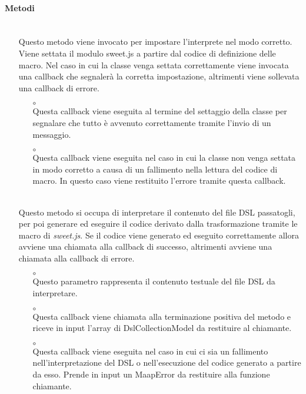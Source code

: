 \paragraph*{Metodi}
\begin{itemize}
\item[]  \\ Questo metodo viene invocato per impostare l'interprete nel modo corretto. Viene settata il modulo sweet.js a partire dal codice di definizione delle macro. Nel caso in cui la classe venga settata correttamente viene invocata una callback che segnalerà la corretta impostazione, altrimenti viene sollevata una callback di errore.
\begin{itemize}\addtolength{\itemsep}{-0.5\baselineskip}
\item[$\circ$]  \\ Questa callback viene eseguita al termine del settaggio della classe per segnalare che tutto è avvenuto correttamente tramite l'invio di un messaggio.
\item[$\circ$]  \\ Questa callback viene eseguita nel caso in cui la classe non venga settata in modo corretto a causa di un fallimento nella lettura del codice di macro. In questo caso viene restituito l'errore tramite questa callback.
\end{itemize}
\item[]  \\ Questo metodo si occupa di interpretare il contenuto del file DSL passatogli, per poi generare ed eseguire il codice derivato dalla trasformazione tramite le macro di \textit{sweet.js}. Se il codice viene generato ed eseguito correttamente allora avviene una chiamata alla callback di successo, altrimenti avviene una chiamata alla callback di errore.
\begin{itemize}\addtolength{\itemsep}{-0.5\baselineskip}
\item[$\circ$]  \\ Questo parametro rappresenta il contenuto testuale del file DSL da interpretare.
\item[$\circ$]  \\ Questa callback viene chiamata alla terminazione positiva del metodo e riceve in input l'array di DslCollectionModel da restituire al chiamante.
\item[$\circ$]  \\ Questa callback viene eseguita nel caso in cui ci sia un fallimento nell'interpretazione del DSL o nell'esecuzione del codice generato a partire da esso. Prende in input un MaapError da restituire alla funzione chiamante.
\end{itemize}
\end{itemize}


